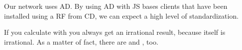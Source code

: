 \documentclass{article}
\newcommand{\citename}[1]{#1\protect\nocite{#1}}
\begin{document}
Our network uses \citename{AD}. By using \citename{AD} with \citename{JS} bases clients that have been installed using a \citename{RF} from \citename{CD}, we can expect a high level of standardization.

If you calculate with \cite{sym:pi} you always get an irrational result, because \cite{sym:pi} itself is irrational. As a matter of fact, there are \cite{sym:phi} and \cite{sym:lambda}, too.



\end{document}
